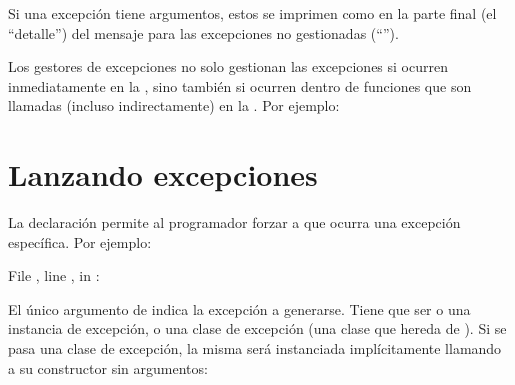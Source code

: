 \documentclass[a5paper,10pt,spanish]{sphinxmanual}
\begin{document}
\sphinxAtStartPar
Si una excepción tiene argumentos, estos se imprimen como en la parte final (el “detalle”) del mensaje para las excepciones no gestionadas (“”).

\sphinxAtStartPar
Los gestores de excepciones no solo gestionan las excepciones si ocurren inmediatamente en la , sino también si ocurren dentro de funciones que son llamadas (incluso indirectamente) en la . Por ejemplo:

\begin{sphinxVerbatim}[commandchars=\\\{\}]
 
      
    
   
     
\end{sphinxVerbatim}


\section{Lanzando excepciones}
\label{\detokenize{tutorial/errors:raising-exceptions}}\label{\detokenize{tutorial/errors:tut-raising}}
\sphinxAtStartPar
La declaración  permite al programador forzar a que ocurra una excepción específica.  Por ejemplo:

\begin{sphinxVerbatim}[commandchars=\\\{\}]
 
  File , line , in 
: 
\end{sphinxVerbatim}

\sphinxAtStartPar
El único argumento de  indica la excepción a generarse. Tiene que ser o una instancia de excepción, o una clase de excepción (una clase que hereda de ). Si se pasa una clase de excepción, la misma será instanciada implícitamente llamando a su constructor sin argumentos:
\end{document}
